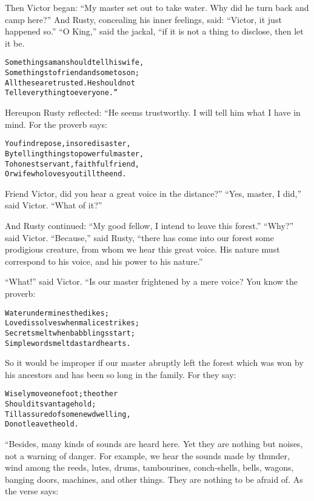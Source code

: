 \documentclass{article}
\renewenvironment{verbatim}{\begin{alltt}\normalfont\begin{centering}}{\end{centering}\end{alltt}}
\begin{document}
Then Victor began:
``My master set out to take water. Why did he turn back and camp here?''
And Rusty, concealing his inner feelings, said:
``Victor, it just happened so.'' ``O King,'' said the jackal, “if
it is not a thing to disclose, then let it be.

\begin{verbatim}
Some things a man should tell his wife,
    Some things to friend and some to son;
All these are trusted. He should not
    Tell everything to everyone.”
\end{verbatim}
Hereupon Rusty reflected: “He seems trustworthy. I will tell him
what I have in mind. For the proverb says:

\begin{verbatim}
You find repose, in sore disaster,
By telling things to powerful master,
To honest servant, faithful friend,
Or wife who loves you till the end.
\end{verbatim}
Friend Victor, did you hear a great voice in the distance?”
``Yes, master, I did,'' said Victor. ``What of it?''

And Rusty continued:
``My good fellow, I intend to leave this forest.'' ``Why?'' said
Victor. ``Because,'' said Rusty,
``there has come into our forest some prodigious creature, from whom we hear this great voice. His nature must correspond to his voice, and his power to his nature.''

``What!'' said Victor. “Is our master frightened by a mere voice?
You know the proverb:

\begin{verbatim}
Water undermines the dikes;
Love dissolves when malice strikes;
Secrets melt when babblings start;
Simple words melt dastard hearts.
\end{verbatim}
So it would be improper if our master abruptly left the forest
which was won by his ancestors and has been so long in the family.
For they say:

\begin{verbatim}
Wisely move one foot; the other
    Should its vantage hold;
Till assured of some new dwelling,
    Do not leave the old.
\end{verbatim}
“Besides, many kinds of sounds are heard here. Yet they are nothing
but noises, not a warning of danger. For example, we hear the
sounds made by thunder, wind among the reeds, lutes, drums,
tambourines, conch-shells, bells, wagons, banging doors, machines,
and other things. They are nothing to be afraid of. As the verse
says:
\end{document}
